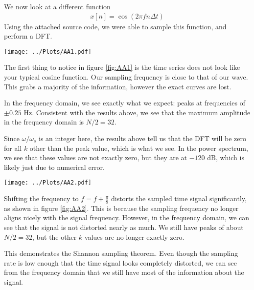\documentclass[twocolumn]{myarticle}
\begin{document}
We now look at a different function 
\begin{align}
    x[n] = \cos\left(2\pi f n\Delta t\right)
\end{align}
Using the attached source code, we were able to sample this function, and perform a DFT.

\begin{figure*}[htb]
    \centering
    \texttt{[image: ../Plots/AA1.pdf]}
    \caption{%
        DFT of $x[n]=\cos(2\pi fn\Delta t)$. Top figure showing the sampled time series, the middle showing the DFT, and the bottom displaying the power in dB.
    }
    \label{fig:AA1}
\end{figure*}

The first thing to notice in figure \ref{fig:AA1} is the time series does not look like your typical cosine function. 
Our sampling frequency is close to that of our wave. 
This grabs a majority of the information, however the exact curves are lost. 

In the frequency domain, we see exactly what we expect: peaks at frequencies of $ \pm 0.25 $ Hz. 
Consistent with the results above, we see that the maximum amplitude in the frequency domain is $ N/2 = 32 $.

Since $ \omega/\omega_s $ is an integer here, the results above tell us that the DFT will be zero for all $ k $ other than the peak value, which is what we see.
In the power spectrum, we see that these values are not exactly zero, but they are at $ -120 $ dB, which is likely just due to numerical error.

\begin{figure*}[htb]
    \centering
    \texttt{[image: ../Plots/AA2.pdf]}
    \caption{%
        DFT of the modified cosine of $x[n]=\cos(2\pi (f+\pi/8) n\Delta t)$. Top figure showing the sampled time series, the middle showing the DFT, and the bottom displaying the power in dB.
    }
    \label{fig:AA2}
\end{figure*}
Shifting the frequency to $f=f+\frac{\pi}{8}$ distorts the sampled time signal significantly, as shown in figure \ref{fig:AA2}. 
This is because the sampling frequency no longer aligns nicely with the signal frequency.
However, in the frequency domain, we can see that the signal is not distorted nearly as much.
We still have peaks of about $ N/2 = 32 $, but the other $ k $ values are no longer exactly zero.

This demonstrates the Shannon sampling theorem.
Even though the sampling rate is low enough that the time signal looks completely distorted, we can see from the frequency domain that we still have most of the information about the signal.
\end{document}
